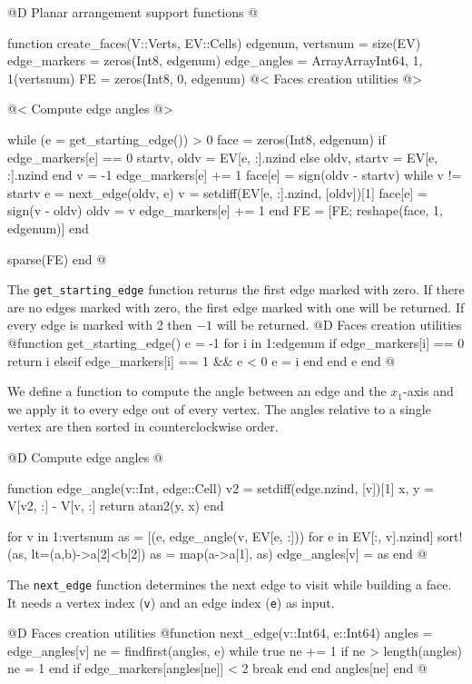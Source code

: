\documentclass[10pt,oneside]{article}
\begin{document}
@D Planar arrangement support functions
@{function create_faces(V::Verts, EV::Cells)
    edgenum, vertsnum = size(EV)
    edge_markers = zeros(Int8, edgenum)
    edge_angles = Array{Array{Int64, 1}, 1}(vertsnum)
    FE = zeros(Int8, 0, edgenum)
    @< Faces creation utilities @>

    @< Compute edge angles @>

    while (e = get_starting_edge()) > 0
        face = zeros(Int8, edgenum)
        if edge_markers[e] == 0
            startv, oldv = EV[e, :].nzind
        else
            oldv, startv = EV[e, :].nzind
        end
        v = -1
        edge_markers[e] += 1
        face[e] = sign(oldv - startv)
        while v != startv
            e = next_edge(oldv, e)
            v = setdiff(EV[e, :].nzind, [oldv])[1]
            face[e] = sign(v - oldv)
            oldv = v
            edge_markers[e] += 1
        end
        FE = [FE; reshape(face, 1, edgenum)]
    end

    sparse(FE)
end
@}
The \texttt{get\_starting\_edge} function returns the first edge
marked with zero. If there are no edges marked with zero, the first edge
marked with one will be returned. If every edge is marked with 2 then $-1$
will be returned.
@D Faces creation utilities
@{function get_starting_edge()
    e = -1
    for i in 1:edgenum
        if edge_markers[i] == 0
            return i
        elseif edge_markers[i] == 1 && e < 0
            e = i
        end
    end
    e
end
@}

We define a function to compute the angle between an edge and the 
$x_1$-axis and we apply it to every edge out of every vertex.
The angles relative to a single vertex are then sorted in counterclockwise order.

@D Compute edge angles
@{function edge_angle(v::Int, edge::Cell)
    v2 = setdiff(edge.nzind, [v])[1]
    x, y = V[v2, :] - V[v, :]
    return atan2(y, x)
end

for v in 1:vertsnum
    as = [(e, edge_angle(v, EV[e, :])) for e in EV[:, v].nzind]
    sort!(as, lt=(a,b)->a[2]<b[2])
    as = map(a->a[1], as)
    edge_angles[v] = as
end
@}

The \texttt{next\_edge} function determines the next edge to visit
while building a face. It needs a vertex index (\texttt{v}) and 
an edge index (\texttt{e}) as input.

@D Faces creation utilities
@{function next_edge(v::Int64, e::Int64)
    angles = edge_angles[v]
    ne = findfirst(angles, e)
    while true
        ne += 1
        if ne > length(angles)
            ne = 1
        end
        if edge_markers[angles[ne]] < 2
            break
        end
    end
    angles[ne]
end
@}
\end{document}
